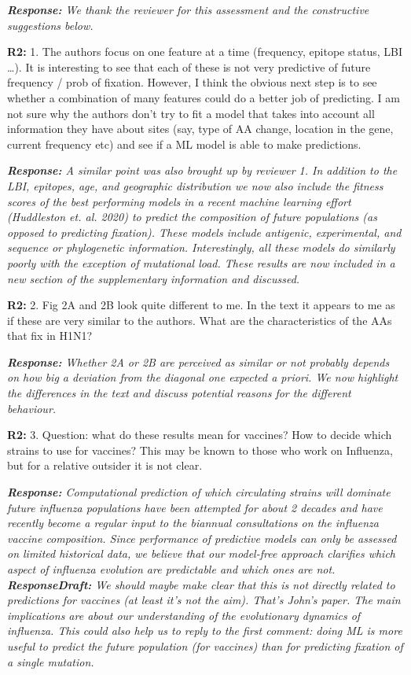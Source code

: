 \documentclass[aps,rmp,onecolumn]{revtex4-1}
\newcommand{\refb}[1]{\textbf{R2:} #1\vskip 5mm}
\newcommand{\response}[1]{{\it {\color{response}\textbf{Response:} #1}}\vskip 5mm}
\newcommand{\responsedraft}[1]{{\it {\color{purple}\textbf{ResponseDraft:} #1}}\vskip 5mm}
\begin{document}
\response{We thank the reviewer for this assessment and the constructive suggestions below. }

\refb{1. The authors focus on one feature at a time (frequency, epitope status, LBI …). It is interesting to see that each of these is not very predictive of future frequency / prob of fixation. However, I think the obvious next step is to see whether a combination of many features could do a better job of predicting. I am not sure why the authors don’t try to fit a model that takes into account all information they have about sites (say, type of AA change, location in the gene, current frequency etc) and see if a ML model is able to make predictions. }

\response{
	A similar point was also brought up by reviewer 1.
	In addition to the LBI, epitopes, age, and geographic distribution we now also include the fitness scores of the best performing models in a recent machine learning effort (Huddleston \emph{et. al.} 2020) to predict the composition of future populations (as opposed to predicting fixation).
	These models include antigenic, experimental, and sequence or phylogenetic information.
	Interestingly, all these models do similarly poorly with the exception of mutational load.
	These results are now included in a new section of the supplementary information and discussed.
}

\refb{2. Fig 2A and 2B look quite different to me. In the text it appears to me as if these are very similar to the authors. What are the characteristics of the AAs that fix in H1N1? }

\response{Whether 2A or 2B are perceived as similar or not probably depends on how big a deviation from the diagonal one expected a priori.
We now highlight the differences in the text and discuss potential reasons for the different behaviour.  }

\refb{3. Question: what do these results mean for vaccines? How to decide which strains to use for vaccines? This may be known to those who work on Influenza, but for a relative outsider it is not clear. }

\response{
	Computational prediction of which circulating strains will dominate future influenza populations have been attempted for about 2 decades and have recently become a regular input to the biannual consultations on the influenza vaccine composition.
	Since performance of predictive models can only be assessed on limited historical data, we believe that our model-free approach clarifies which aspect of influenza evolution are predictable and which ones are not.
}
\responsedraft{We should maybe make clear that this is not directly related to predictions for vaccines (at least it's not the aim).
That's John's paper.
The main implications are about our understanding of the evolutionary dynamics of influenza.
This could also help us to reply to the first comment: doing ML is more useful to predict the future population (for vaccines) than for predicting fixation of a single mutation. }
\end{document}
